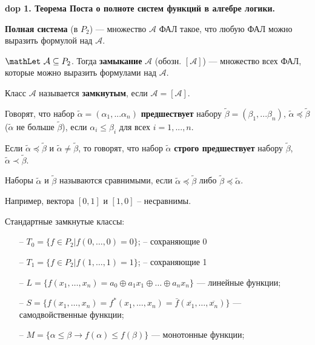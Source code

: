 \textbf{\LARGE dop 1. Теорема Поста о полноте систем функций в алгебре логики.}


\textbf{Полная система} (в $P_2$) --- множество $\mathcal{A}$ ФАЛ такое, что любую ФАЛ можно выразить формулой над $\mathcal{A}$.

$\mathLet ~ \mathcal{A} \subseteq P_2$. Тогда \textbf{замыкание} $\mathcal{A}$ (обозн. $[\mathcal{A}]$) --- множество всех ФАЛ, которые можно выразить формулами над $\mathcal{A}$.

Класс $\mathcal{A}$ называется \textbf{замкнутым}, если $\mathcal{A} = [\mathcal{A}]$.

Говорят, что набор $\tilde{\alpha} = (\alpha_1, ... \alpha_n)$ \textbf{предшествует} набору $\tilde{\beta} = (\beta_1, ... \beta_n)$,  $\tilde{\alpha} \preccurlyeq \tilde{\beta}$ ($\tilde{\alpha}$ не больше $\tilde{\beta}$), если $\alpha_i \leqslant \beta_i$ для всех $i = 1, ..., n$.

Если $\tilde{\alpha} \preccurlyeq \tilde{\beta}$ и $\tilde{\alpha} \neq \tilde{\beta}$, то говорят, что набор $\tilde{\alpha}$ \textbf{строго предшествует} набору $\tilde{\beta}$, $\tilde{\alpha} \prec \tilde{\beta}$.

Наборы $\tilde{\alpha}$ и $\tilde{\beta}$ называются сравнимыми, если $\tilde{\alpha} \preccurlyeq \tilde{\beta}$ либо $\tilde{\beta} \preccurlyeq \tilde{\alpha}$.

Например, вектора $[0, 1]$ и $[1, 0]$ -- несравнимы.

Стандартные замкнутые классы:
\begin{itemize}
    \item[--] $T_0 = \{f \in P_2 | f(0, \dots, 0) = 0\}$; -- сохраняющие 0
    \item[--] $T_1 = \{f \in P_2 | f(1, \dots, 1) = 1\}$; -- сохраняющие 1
    \item[--] $L = \{f(x_1, \dots, x_n) = a_0 \oplus a_1 x_1 \oplus \dots \oplus a_n x_n\}$ --- линейные функции;
    \item[--] $S = \{f(x_1, \dots, x_n) = f^*(x_1, \dots, x_n) = \bar{f}(\overline{x_1}, \dots, \overline{x_n})\}$ --- самодвойственные функции;
    \item[--] $M = \{\alpha \leqslant \beta \rightarrow f(\alpha) \leqslant f(\beta)\}$ --- монотонные функции;
\end{itemize}

